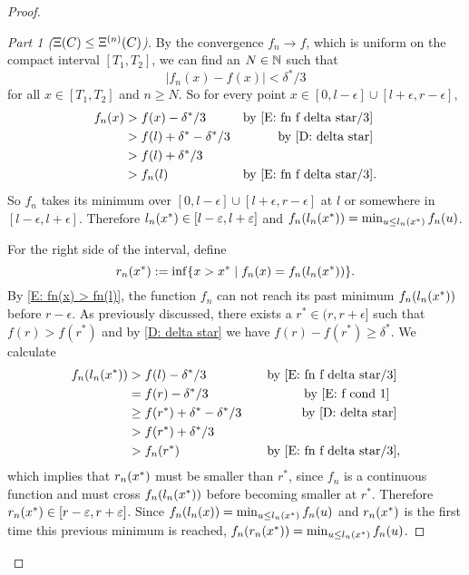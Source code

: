\begin{proof}
\begin{proof}[Part 1 ($\Xi(C) \leq \Xi^{(n)}(C)$)]
By the convergence $f_n \rightarrow f$, 
which is uniform on the compact interval $[T_1, T_2]$, 
we can find an $N \in \mathbb{N}$ such that 
\begin{equation} \label{E: fn f delta star/3}
|f_n(x) - f(x)| < \delta^* / 3
\end{equation} for all
$x \in [T_1, T_2]$ and $n \geq N$.
So for every point $x \in [0, l - \epsilon]\cup[l + \epsilon, r - \epsilon]$,
\begin{equation} \label{E: fn(x) > fn(l)}
\begin{aligned}
f_n(x) 
&> f(x) - \delta^* / 3  &\text{by \eqref{E: fn f delta star/3}\;}\\
&> f(l) + \delta^* - \delta^* / 3  &\text{by \eqref{D: delta star}\;}\\
&> f(l) + \delta^* / 3 &\\
&> f_n(l)  &\text{by \eqref{E: fn f delta star/3}}.
\end{aligned}
\end{equation}
So $f_n$ takes its minimum over 
$[0, l - \epsilon]\cup[l + \epsilon, r - \epsilon]$
at $l$ or somewhere in $[l-\epsilon, l+\epsilon]$.
Therefore $l_n(x^*) \in [l-\varepsilon, l+\varepsilon]$ and $f_n(l_n(x^*)) = \min_{u \leq l_n(x^*)} f_n(u)$.

\bigskip

For the right side of the interval, define
\begin{equation} \label{D: rnx}
r_n(x^*) := \inf \{ x > x^* \; | \; f_n(x) = f_n(l_n(x^*)) \}.
\end{equation}
By \eqref{E: fn(x) > fn(l)}, the function $f_n$ can not reach its past minimum $f_n(l_n(x^*))$
before $r-\epsilon$.
As previously discussed,
there exists a $r^* \in (r, r+\epsilon]$ such that $f(r) > f(r^*)$ 
and by \eqref{D: delta star} we have $f(r) - f(r^*) \geq \delta^*$.
We calculate
\begin{equation*}
\begin{aligned}
f_n(l_n(x^*)) 
&> f(l) - \delta^* / 3 \quad &\text{by \eqref{E: fn f delta star/3}\;}\\
&= f(r) - \delta^* / 3 \quad &\text{by \eqref{E: f cond 1}\;\;\;}\\
&\geq f(r^*) + \delta^* - \delta^* / 3 \quad &\text{by \eqref{D: delta star}\;} \\
&> f(r^*) + \delta^*/3 \\
&> f_n(r^*) \quad &\text{by \eqref{E: fn f delta star/3}},
\end{aligned}
\end{equation*}
which implies that $r_n(x^*)$ must be smaller than $r^*$,
since $f_n$ is a continuous function and must cross $f_n(l_n(x^*))$ before becoming smaller at $r^*$.
Therefore $r_n(x^*) \in [r - \varepsilon, r+ \varepsilon]$.
Since $f_n(l_n(x)) = \min_{u \leq l_n(x^*)} f_n(u)$
and $r_n(x^*)$ is the first time this previous minimum is reached,
$f_n(r_n(x^*)) = \min_{u \leq l_n(x^*)} f_n(u)$.


\end{proof}
\end{proof}
